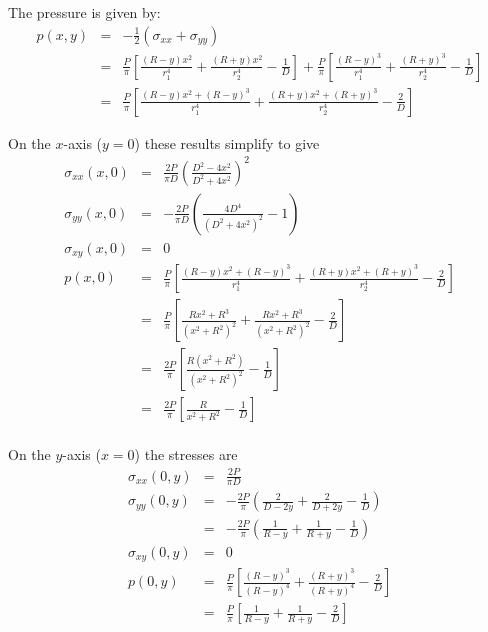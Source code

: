 The pressure is given by:
\begin{eqnarray}
p(x,y) 
&=& -\frac{1}{2}(\sigma_{xx} + \sigma_{yy}) \nonumber\\
&=& 
 \frac{P}{\pi} \left[ \frac{(R-y)x^2}{r_1^4} + \frac{(R+y)x^2}{r_2^4} -\frac{1}{D} \right] 
+ \frac{P}{\pi} \left[ \frac{(R-y)^3}{r_1^4} + \frac{(R+y)^3}{r_2^4} -\frac{1}{D} \right] \\
&=& 
\frac{P}{\pi} \left[ \frac{(R-y)x^2 + (R-y)^3 }{r_1^4} + \frac{(R+y)x^2 + (R+y)^3}{r_2^4} - \frac{2}{D}\right] 
\end{eqnarray}

On the $x$-axis ($y=0$) these results simplify to give
\begin{eqnarray}
\sigma_{xx}(x,0) &=& \frac{2P}{\pi D} \left( \frac{D^2-4x^2}{D^2+4x^2}  \right)^2 \\
\sigma_{yy}(x,0) &=& -\frac{2P}{\pi D} \left( \frac{4D^4}{(D^2+4x^2)^2} -1 \right) \\
\sigma_{xy}(x,0) &=& 0 \\
p(x,0) 
&=& \frac{P}{\pi} \left[ \frac{(R-y)x^2 + (R-y)^3 }{r_1^4} + \frac{(R+y)x^2 + (R+y)^3  }{r_2^4}  - \frac{2}{D} \right] \\
&=& \frac{P}{\pi} \left[ \frac{Rx^2 + R^3 }{(x^2+R^2)^2} + \frac{Rx^2 + R^3  }{(x^2+R^2)^2}  - \frac{2}{D} \right] \\
&=& \frac{2P}{\pi} \left[ \frac{R(x^2 + R^2 )}{(x^2+R^2)^2} - \frac{1}{D} \right] \\
&=& \frac{2P}{\pi} \left[ \frac{R }{x^2+R^2} - \frac{1}{D} \right] \\
\end{eqnarray}

On the $y$-axis ($x=0$) the stresses are 
\begin{eqnarray}
\sigma_{xx}(0,y) &=& \frac{2P}{\pi D} \\
\sigma_{yy}(0,y) 
&=& -\frac{2P}{\pi} \left( \frac{2}{D-2y} + \frac{2}{D+2y} -\frac{1}{D} \right) \\
&=& -\frac{2P}{\pi} \left( \frac{1}{R-y} + \frac{1}{R+y} -\frac{1}{D} \right) \\
\sigma_{xy} (0,y) &=& 0 \\
p(0,y) 
&=& \frac{P}{\pi} \left[ \frac{(R-y)^3 }{(R-y)^4} + \frac{ (R+y)^3  }{(R+y)^4}  - \frac{2}{D} \right] \\
&=& \frac{P}{\pi} \left[ \frac{1}{R-y} + \frac{ 1 }{R+y}  - \frac{2}{D} \right] \\
\end{eqnarray}

